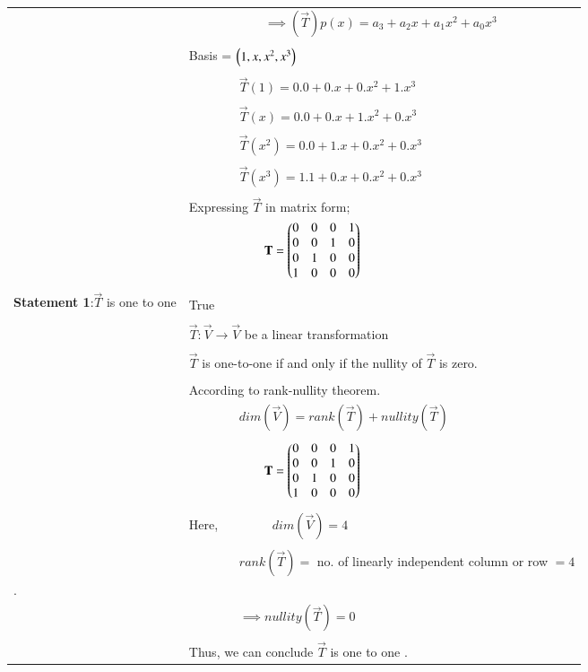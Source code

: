 \begin{longtable}{|p{5cm}|p{13cm}|}
	& $\qquad\qquad\qquad\implies (\vec{T})p(x)=a_3+a_2x+a_1x^2+a_0x^3$\\
	&\\
	& Basis = $\left(1,x,x^2,x^3\right)$\\
	&\\
    & $\qquad\qquad\vec{T}(1) = 0.0+0.x+0.x^2+1.x^3$\\
    &\\
    & $\qquad\qquad\vec{T}(x) = 0.0+0.x+1.x^2+0.x^3$\\
    &\\
    & $\qquad\qquad\vec{T}(x^2) = 0.0+1.x+0.x^2+0.x^3$\\
    &\\
    & $\qquad\qquad\vec{T}(x^3) = 1.1+0.x+0.x^2+0.x^3$\\
    &\\
    & Expressing $\vec{T}$ in matrix form;\\
    \hline
    & $\qquad\qquad\qquad\mathbf{T}=\begin{pmatrix}0&0&0&1\\0&0&1&0\\0&1&0&0\\1&0&0&0\end{pmatrix}$\\
	&\\
	\hline
	\multirow{3}{*}{\textbf{Statement 1}:$\vec{T}$ is one to one } & \\
	& True\\
	\hline
	&\\
	& $\vec{T}:\vec{V}\rightarrow\vec{V}$ be a linear transformation\\
	&\\
	& $\vec{T}$ is one-to-one if and only if the nullity of $\vec{T}$ is zero.\\
	&\\
	& According to rank-nullity theorem.\\
    & $\qquad\qquad dim(\vec{V})=rank(\vec{T})+nullity(\vec{T})$\\
    &\\
    & $\qquad\qquad\qquad\mathbf{T}=\begin{pmatrix}0&0&0&1\\0&0&1&0\\0&1&0&0\\1&0&0&0\end{pmatrix}$\\
	&\\
	& Here, $\qquad\qquad dim(\vec{V}) = 4$\\
	&\\
	& $\qquad\qquad rank(\vec{T})=$ no. of linearly independent column or row $=4$\\.
	&\\
	& $\qquad\qquad\implies nullity (\vec{T}) = 0$\\
	&\\
	& Thus, we can conclude $\vec{T}$ is one to one .\\
	  

\end{longtable}
